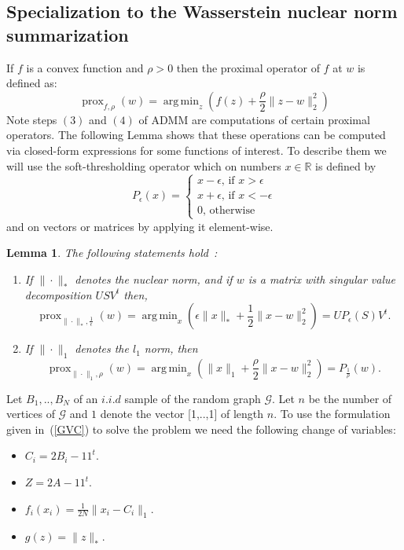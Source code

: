 \documentclass[12pt]{amsart}
\newtheorem{lemma}{Lemma}[section]
\theoremstyle{remark}
\DeclareMathOperator*{\argmin}{arg\,min}
\newcommand{\prox}{\operatorname{prox}}
\newcommand{\RR}{\mathbb{R}}
\newcommand{\grG}{{\mathcal{G}}}
\begin{document}
\subsection{Specialization to the Wasserstein nuclear norm summarization}

If $f$ is a convex function and $\rho > 0$ then the proximal operator of $f$ at $w$ is defined as:
\[
\prox_{f,\rho}(w) = \argmin_{z} \left(f(z)+ \frac{\rho}{2}\|z-w\|_2^2\right)
\]
Note steps $(3)$ and $(4)$ of ADMM are computations of certain proximal operators. 
The following Lemma shows that these operations can be computed via closed-form expressions for some functions of interest. To describe them we will use the soft-thresholding operator
which on numbers $x\in \RR$ is defined by 
\[ P_{\epsilon}(x)=\begin{cases}
x-\epsilon\text{, if $x>\epsilon$}\\
x+\epsilon\text{, if $x<-\epsilon$}\\
0\text{, otherwise}
\end{cases}
\]
and on vectors or matrices by applying it element-wise.

\begin{lemma}\label{lem:prox} The following statements hold~\cite{LinChenMa}:
\begin{enumerate}
\item If $\|\cdot\|_*$ denotes the nuclear norm, and if $w$ is a matrix with singular value decomposition $USV^t$ then,
\[
\prox_{\|\cdot\|_*,\frac{1}{\epsilon}}(w)=\argmin_x \left(\epsilon\|x\|_* + \frac{1}{2}\|x-w\|_2^2\right) = UP_{\epsilon}(S)V^t. 
\]
\item If $\|\cdot\|_1$ denotes the $l_1$ norm, then
\[
\prox_{\|\cdot\|_1,\rho}(w) = \argmin_x \left(\|x\|_1 + \frac{\rho}{2}\|x-w\|_2^2\right) = P_{\frac{1}{\rho}}(w).
\]
\end{enumerate}

\end{lemma}

Let $B_1,..,B_N$ of an $i.i.d$ sample of the random graph $\grG$. Let $n$ be the number of vertices of $\grG$ and $1$ denote the vector [1,..,1] of length $n$. To use the formulation given in~(\ref{GVC}) to solve the problem we need the following change of variables:


\begin{itemize}
\item $C_i = 2B_i-11^t$.
\item $Z = 2A-11^t$.
\item $f_i(x_i) = \frac{1}{2N}\|x_i-C_i\|_1$.
\item $g(z)=\|z\|_*$.
\end{itemize}
\end{document}
